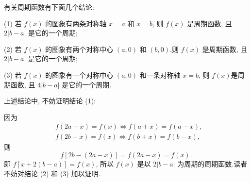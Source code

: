 \begin{note}
	有关周期函数有下面几个结论:

	(1) 若 $f(x)$ 的图象有两条对称轴 $x=a$ 和 $x=b$, 则 $f(x)$ 是周期函数, 且 $2|b-a|$ 是它的一个周期;

	(2) 若 $f(x)$ 的图象有两个对称中心 $(a, 0)$ 和 $(b, 0)$,则 $f(x)$ 是周期函数, 且 $2|b-a|$ 是它的一个周期;

	(3) 若 $f(x)$ 的图象有一个对称中心 $(a, 0)$ 和一条对称轴 $x=b$, 则 $f(x)$是周期函数, 且 $4|b-a|$ 是它的一个周期.

	上述结论中, 不妨证明结论 (1):

	因为
	$$
		\begin{aligned}
			 & f(2 a-x)=f(x) \Leftrightarrow f(a+x)=f(a-x), \\
			 & f(2 b-x)=f(x) \Leftrightarrow f(b+x)=f(b-x),
		\end{aligned}
	$$
	则
	$$
		f[2 b-(2 a-x)]=f(2 a-x)=f(x) .
	$$
	即 $f[x+2(b-a)]=f(x)$, 所以 $f(x)$ 是以 $2|b-a|$ 为周期的周期函数.读者不妨对结论 (2) 和 (3) 加以证明.
\end{note}

